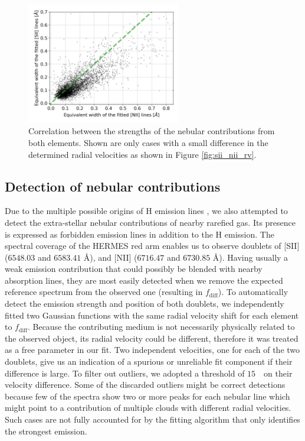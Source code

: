 \begin{figure}
	\centering
	\includegraphics[width=0.6\textwidth]{sii_nii_ew_corr.png}
	\caption{Correlation between the strengths of the nebular contributions from both elements. Shown are only cases with a small difference in the determined radial velocities as shown in Figure \ref{fig:sii_nii_rv}.}
	\label{fig:sii_nii_ew}
\end{figure}

\subsection{Detection of nebular contributions}
\label{sec:nebularemis}
Due to the multiple possible origins of H emission lines \citep{2007ASSL..342.....K}, we also attempted to detect the extra-stellar nebular contributions of nearby rarefied gas. Its presence is expressed as forbidden emission lines in addition to the H emission. The spectral coverage  of the HERMES red arm enables us to observe doublets of [SII] ($6548.03$ and $6583.41$ \AA), and [NII] ($6716.47$ and $6730.85$ \AA). Having usually a weak emission contribution that could possibly be blended with nearby absorption lines, they are most easily detected when we remove the expected reference spectrum from the observed one (resulting in $f_\mathrm{diff}$). To automatically detect the emission strength and position of both doublets, we independently fitted two Gaussian functions with the same radial velocity shift for each element to $f_\mathrm{diff}$. Because the contributing medium is not necessarily physically related to the observed object, its radial velocity could be different, therefore it was treated as a free parameter in our fit. Two independent velocities, one for each of the two doublets, give us an indication of a spurious or unreliable fit component if their difference is large. To filter out outliers, we adopted a threshold of $15$~\kms\ on their velocity difference. Some of the discarded outliers might be correct detections because few of the spectra show two or more peaks for each nebular line which might point to a contribution of multiple clouds with different radial velocities. Such cases are not fully accounted for by the fitting algorithm that only identifies the strongest emission.

